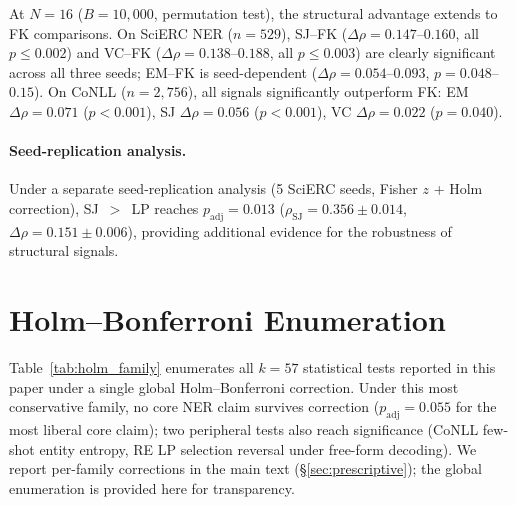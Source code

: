 At $N{=}16$ ($B{=}10{,}000$, permutation test), the structural advantage extends to FK comparisons.
On SciERC NER ($n{=}529$), SJ--FK ($\Delta\rho{=}0.147$--$0.160$, all $p{\leq}0.002$) and VC--FK ($\Delta\rho{=}0.138$--$0.188$, all $p{\leq}0.003$) are clearly significant across all three seeds; EM--FK is seed-dependent ($\Delta\rho{=}0.054$--$0.093$, $p{=}0.048$--$0.15$).
On CoNLL ($n{=}2{,}756$), all signals significantly outperform FK: EM $\Delta\rho{=}0.071$ ($p{<}0.001$), SJ $\Delta\rho{=}0.056$ ($p{<}0.001$), VC $\Delta\rho{=}0.022$ ($p{=}0.040$).

\paragraph{Seed-replication analysis.}
Under a separate seed-replication analysis (5 SciERC seeds, Fisher $z$ + Holm correction), SJ~${>}$~LP reaches $p_{\text{adj}}{=}0.013$ ($\rho_{\text{SJ}}{=}0.356{\pm}0.014$, $\Delta\rho{=}0.151{\pm}0.006$), providing additional evidence for the robustness of structural signals.

\section{Holm--Bonferroni Enumeration}\label{app:holm}

Table~\ref{tab:holm_family} enumerates all $k{=}57$ statistical tests reported in this paper under a single global Holm--Bonferroni correction.
Under this most conservative family, no core NER claim survives correction ($p_{\text{adj}}{=}0.055$ for the most liberal core claim); two peripheral tests also reach significance (CoNLL few-shot entity entropy, RE LP selection reversal under free-form decoding).
We report per-family corrections in the main text (\S\ref{sec:prescriptive}); the global enumeration is provided here for transparency.

